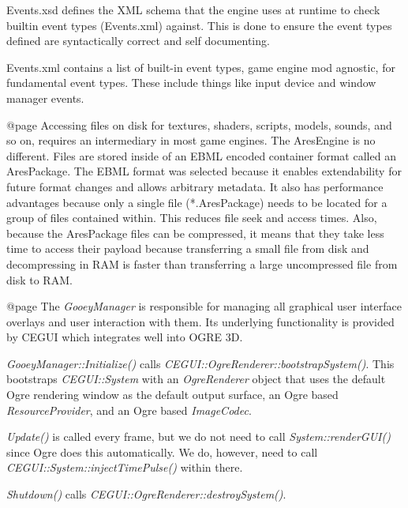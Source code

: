 Events.xsd defines the XML schema that the engine uses at runtime to check builtin event types (Events.xml) against. This is done to ensure the event types defined are syntactically correct and self documenting.

Events.xml contains a list of built-in event types, game engine mod agnostic, for fundamental event types. These include things like input device and window manager events.

    {}

@page 
Accessing files on disk for textures, shaders, scripts, models, sounds, and so on, requires an intermediary in most game engines. The AresEngine is no different. Files are stored inside of an EBML encoded container format called an AresPackage. The EBML format was selected because it enables extendability for future format changes and allows arbitrary metadata. It also has performance advantages because only a single file (*.AresPackage) needs to be located for a group of files contained within. This reduces file seek and access times. Also, because the AresPackage files can be compressed, it means that they take less time to access their payload because transferring a small file from disk and decompressing in RAM is faster than transferring a large uncompressed file from disk to RAM.

    {}

@page 
The {\it GooeyManager} is responsible for managing all graphical user interface overlays and user interaction with them. Its underlying functionality is provided by CEGUI which integrates well into OGRE 3D.

{\it GooeyManager::Initialize()} calls {\it CEGUI::OgreRenderer::bootstrapSystem()}. This bootstraps {\it CEGUI::System} with an {\it OgreRenderer} object that uses the default Ogre rendering window as the default output surface, an Ogre based {\it ResourceProvider}, and an Ogre based {\it ImageCodec}.

{\it Update()} is called every frame, but we do not need to call {\it System::renderGUI()} since Ogre does this automatically. We do, however, need to call {\it CEGUI::System::injectTimePulse()} within there.

{\it Shutdown()} calls {\it CEGUI::OgreRenderer::destroySystem()}.

